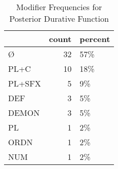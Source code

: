 \begin{table}[htbp!]
\centering
\caption{Modifier Frequencies for Posterior Durative Function}
\label{table:postdur_mod_cp}
\begin{tabular}{lrl}
\toprule
{} &  count & percent \\
\midrule
Ø      &     32 &     57\% \\
PL+C   &     10 &     18\% \\
PL+SFX &      5 &      9\% \\
DEF    &      3 &      5\% \\
DEMON  &      3 &      5\% \\
PL     &      1 &      2\% \\
ORDN   &      1 &      2\% \\
NUM    &      1 &      2\% \\
\bottomrule
\end{tabular}
\end{table}
